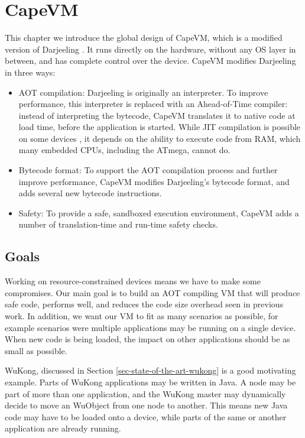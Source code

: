 \chapter{CapeVM}

This chapter we introduce the global design of CapeVM, which is a modified version of Darjeeling \cite{Brouwers:2009cj}. It runs directly on the hardware, without any OS layer in between, and has complete control over the device. CapeVM modifies Darjeeling in three ways:
\begin{itemize}
    \item AOT compilation: Darjeeling is originally an interpreter. To improve performance, this interpreter is replaced with an Ahead-of-Time compiler: instead of interpreting the bytecode, CapeVM translates it to native code at load time, before the application is started. While JIT compilation is possible on some devices \cite{Ellul:2012thesis}, it depends on the ability to execute code from RAM, which many embedded CPUs, including the ATmega, cannot do.
    \item Bytecode format: To support the AOT compilation process and further improve performance, CapeVM modifies Darjeeling's bytecode format, and adds several new bytecode instructions.
    \item Safety: To provide a safe, sandboxed execution environment, CapeVM adds a number of translation-time and run-time safety checks.
\end{itemize}

\section{Goals}
\label{sec-CapeVM-goals}
Working on resource-constrained devices means we have to make some compromises. Our main goal is to build an AOT compiling VM that will produce safe code, performs well, and reduces the code size overhead seen in previous work. In addition, we want our VM to fit as many scenarios as possible, for example scenarios were multiple applications may be running on a single device. When new code is being loaded, the impact on other applications should be as small as possible.

WuKong, discussed in Section \ref{sec-state-of-the-art-wukong} is a good motivating example. Parts of WuKong applications may be written in Java. A node may be part of more than one application, and the WuKong master may dynamically decide to move an WuObject from one node to another. This means new Java code may have to be loaded onto a device, while parts of the same or another application are already running.

